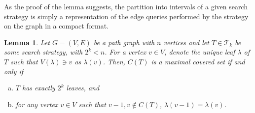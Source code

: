 \documentclass[11pt]{article}
\newtheorem{lemma}{Lemma}[section]
\newcommand{\BSTs}{\mathcal{T}}
\newcommand\+{\mkern2mu}
\begin{document}
As the proof of the lemma suggests, the partition into intervals of a given search strategy is simply a representation of the edge queries performed by the strategy on the graph in a compact format. 

\begin{lemma}\label{lm:non-dominated}
    Let $G=(V, E)$ be a path graph with $n$ vertices and let $T \in \BSTs_k$ be some search strategy, with $2^k < n$. For a vertex $v \in V$, denote the unique leaf $\lambda$ of $T$ such that $V(\lambda) \ni v$ as $\lambda(v)$. Then, $C(T)$ is a maximal covered set if and only if 
    \begin{enumerate}[a)]
        \item $T$ has exactly $2^k$ leaves, and
        \item for any vertex $v \in V$ such that $v-1, v \not \in C(T)$, $\lambda(v-1) = \lambda(v)$.
    \end{enumerate}
\end{lemma}
\end{document}
